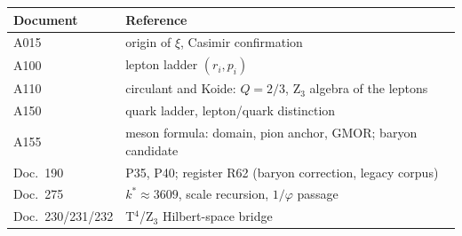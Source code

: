 \begin{center}
{\small\begin{tabular}{ll}
\toprule
Document & Reference \\
\midrule
A015 & origin of $\xi$, Casimir confirmation \\
A100 & lepton ladder $(r_i, p_i)$ \\
A110 & circulant and Koide: $Q=2/3$, Z$_3$ algebra of the leptons \\
A150 & quark ladder, lepton/quark distinction \\
A155 & meson formula: domain, pion anchor, GMOR; baryon candidate \\
Doc.~190 & P35, P40; register R62 (baryon correction, legacy corpus) \\
Doc.~275 & $k^*\approx3609$, scale recursion, $1/\varphi$ passage \\
Doc.~230/231/232 & T$^4$/Z$_3$ Hilbert-space bridge \\
\bottomrule
\end{tabular}}
\end{center}
